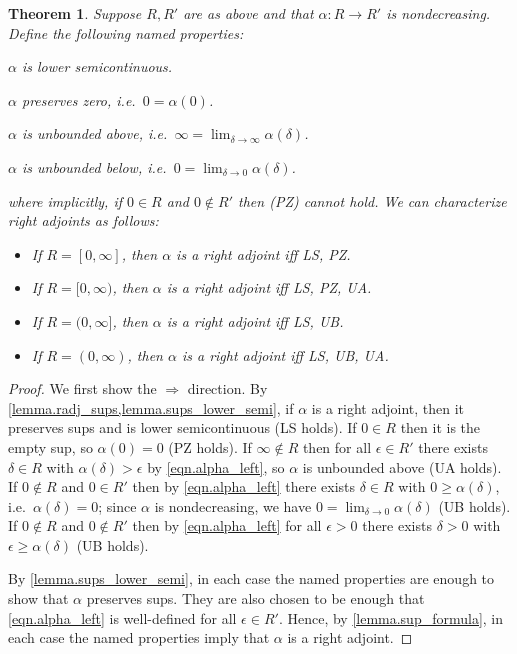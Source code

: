\documentclass[11pt, one side, article]{memoir}
\theoremstyle{definition}
\theoremstyle{plain}
\newtheorem{theorem}[definitionx]{Theorem}
\begin{document}
\begin{theorem}\label{thm.omnibus}
Suppose $R,R'$ are as above and that $\alpha\colon R\to R'$ is nondecreasing. Define the following named properties:
\begin{description}[leftmargin=\parindent,labelindent=\parindent]
	\item[LS:] $\alpha$ is lower semicontinuous.
	\item[PZ:] $\alpha$ preserves zero, i.e.\ $0=\alpha(0)$.
	\item[UA:] $\alpha$ is unbounded above, i.e.\ $\infty=\lim_{\delta\to\infty}\alpha(\delta)$.
	\item[UB:] $\alpha$ is unbounded below, i.e.\ $0=\lim_{\delta\to0}\alpha(\delta)$.
\end{description}
where implicitly, if $0\in R$ and $0\not\in R'$ then (PZ) cannot hold. We can characterize right adjoints as follows:
\begin{itemize}
	\item If $R=[0,\infty]$, then $\alpha$ is a right adjoint iff LS, PZ.
	\item If $R=[0,\infty)$, then $\alpha$ is a right adjoint iff LS, PZ, UA.
	\item If $R=(0,\infty]$, then $\alpha$ is a right adjoint iff LS, UB.
	\item If $R=(0,\infty)$, then $\alpha$ is a right adjoint iff LS, UB, UA.
\end{itemize}
\end{theorem}
\begin{proof}
We first show the $\Rightarrow$ direction. By \cref{lemma.radj_sups,lemma.sups_lower_semi}, if $\alpha$ is a right adjoint, then it preserves sups and is lower semicontinuous (LS holds). If $0\in R$ then it is the empty sup, so $\alpha(0)=0$ (PZ holds). If $\infty\not\in R$ then for all $\epsilon\in R'$ there exists $\delta\in R$ with $\alpha(\delta)>\epsilon$ by \eqref{eqn.alpha_left}, so $\alpha$ is unbounded above (UA holds). If $0\not\in R$ and $0\in R'$ then by \eqref{eqn.alpha_left} there exists $\delta\in R$ with $0\geq\alpha(\delta)$, i.e.\ $\alpha(\delta)=0$; since $\alpha$ is nondecreasing, we have $0=\lim_{\delta\to 0}\alpha(\delta)$ (UB holds). If $0\not\in R$ and $0\not\in R'$ then by \eqref{eqn.alpha_left} for all $\epsilon>0$ there exists $\delta>0$ with $\epsilon\geq\alpha(\delta)$ (UB holds).

By \cref{lemma.sups_lower_semi}, in each case the named properties are enough to show that $\alpha$ preserves sups. They are also chosen to be enough that \eqref{eqn.alpha_left} is well-defined for all $\epsilon\in R'$. Hence, by \cref{lemma.sup_formula}, in each case the named properties imply that $\alpha$ is a right adjoint.
\end{proof}
\end{document}
